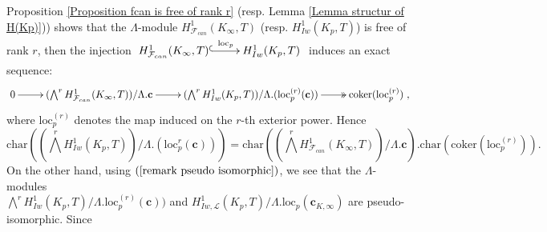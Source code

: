 \documentclass[reqno]{amsart}
\begin{document}
Proposition \ref{Proposition fcan is free of rank r} (resp. Lemma
\ref{Lemma structur of H(Kp)})) shows that the $\Lambda$-module
$H^{1}_{\mathcal{F}_{can}}(K_{\infty},T)$ (resp.
$H^{1}_{Iw}(K_{p},T)$) is free of rank $r$, then the injection
$\xymatrix@=2pc{
H^{1}_{\mathcal{F}_{can}}(K_{\infty},T)\ar@{^{(}->}[r]^-{\mathrm{loc}_{p}}&
H^{1}_{Iw}(K_{p},T)}$ induces an exact sequence:
$$
\xymatrix@=2pc{ 0\ar[r]&
(\bigwedge^{r}H^{1}_{\mathcal{F}_{can}}(K_{\infty},T))/\Lambda.\mathbf{c}\ar[r]&
(\bigwedge^{r}H^{1}_{Iw}(K_{p},T))/\Lambda.(\mathrm{loc}_{p}^{(r)}(\mathbf{c}))\ar@{->>}[r]&
\mathrm{coker}(\mathrm{loc}^{(r)}_{p})},
$$
where $\mathrm{loc}^{(r)}_{p}$ denotes the map induced on the $r$-th
exterior power. Hence
 $$
 \mathrm{char}((\bigwedge^{r}H^{1}_{Iw}(K_{p},T))/\Lambda.(\mathrm{loc}_{p}^{r}(\mathbf{c})))=
 \mathrm{char}((\bigwedge^{r}H^{1}_{\mathcal{F}_{can}}(K_{\infty},T))/\Lambda.\mathbf{c}).
 \mathrm{char}(\mathrm{coker}(\mathrm{loc}^{(r)}_{p})).
 $$
On the other hand, using $(\ref{remark pseudo isomorphic})$, we see
that the $\Lambda$-modules\\
$\bigwedge^{r}H^{1}_{Iw}(K_{p},T)/\Lambda.\mathrm{loc}_{p}^{(r)}(\mathbf{c}))$
and
$H^{1}_{Iw,\mathcal{L}}(K_{p},T)/\Lambda.\mathrm{loc}_{p}(\mathbf{c}_{K,\infty})$
are pseudo-isomorphic. Since
\end{document}
